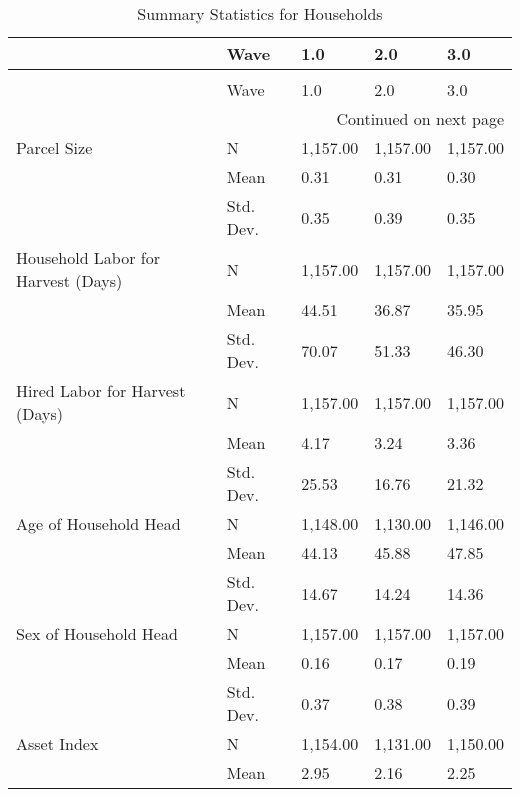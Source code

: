 \begin{longtable}{lllll}
\caption{Summary Statistics for Households}
\label{tbl:summary}\\
\toprule
                             & Wave &       1.0 &       2.0 &       3.0 \\
\midrule
\endfirsthead
\caption[]{Summary Statistics for Households} \\
\toprule
                             & Wave &       1.0 &       2.0 &       3.0 \\
\midrule
\endhead
\midrule
\multicolumn{5}{r}{{Continued on next page}} \\
\midrule
\endfoot

\bottomrule
\endlastfoot
Parcel Size & N &  1,157.00 &  1,157.00 &  1,157.00 \\
                             & Mean &      0.31 &      0.31 &      0.30 \\
                             & Std. Dev. &      0.35 &      0.39 &      0.35 \\
Household Labor for Harvest (Days) & N &  1,157.00 &  1,157.00 &  1,157.00 \\
                             & Mean &     44.51 &     36.87 &     35.95 \\
                             & Std. Dev. &     70.07 &     51.33 &     46.30 \\
Hired Labor for Harvest (Days) & N &  1,157.00 &  1,157.00 &  1,157.00 \\
                             & Mean &      4.17 &      3.24 &      3.36 \\
                             & Std. Dev. &     25.53 &     16.76 &     21.32 \\
Age of Household Head & N &  1,148.00 &  1,130.00 &  1,146.00 \\
                             & Mean &     44.13 &     45.88 &     47.85 \\
                             & Std. Dev. &     14.67 &     14.24 &     14.36 \\
Sex of Household Head & N &  1,157.00 &  1,157.00 &  1,157.00 \\
                             & Mean &      0.16 &      0.17 &      0.19 \\
                             & Std. Dev. &      0.37 &      0.38 &      0.39 \\
Asset Index & N &  1,154.00 &  1,131.00 &  1,150.00 \\
                             & Mean &      2.95 &      2.16 &      2.25 \\

\end{longtable}
